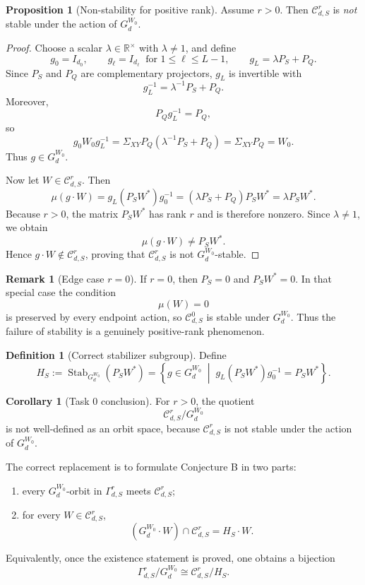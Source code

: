 \documentclass{article}
\newcommand{\Stab}{\operatorname{Stab}}
\theoremstyle{definition}
\newtheorem{proposition}[theorem]{Proposition}
\newtheorem{corollary}[theorem]{Corollary}
\newtheorem{definition}[theorem]{Definition}
\newtheorem{remark}[theorem]{Remark}
\begin{document}
\begin{proposition}[Non-stability for positive rank]\label{prop:nonstable-positive-rank}
Assume $r>0$. Then $\mathcal C_{d,S}^r$ is \emph{not} stable under the action of $G_d^{W_0}$.
\end{proposition}

\begin{proof}
Choose a scalar $\lambda\in \mathbb R^\times$ with $\lambda\neq 1$, and define
\[
g_0=I_{d_0},
\qquad
g_\ell=I_{d_\ell}\ \text{ for }1\le \ell\le L-1,
\qquad
g_L=\lambda P_S+P_Q.
\]
Since $P_S$ and $P_Q$ are complementary projectors, $g_L$ is invertible with
\[
g_L^{-1}=\lambda^{-1}P_S+P_Q.
\]
Moreover,
\[
P_Qg_L^{-1}=P_Q,
\]
so
\[
g_0W_0g_L^{-1}
=
\Sigma_{XY}P_Q(\lambda^{-1}P_S+P_Q)
=
\Sigma_{XY}P_Q
=
W_0.
\]
Thus $g\in G_d^{W_0}$.

Now let $W\in \mathcal C_{d,S}^r$. Then
\[
\mu(g\cdot W)=g_L(P_SW^\ast)g_0^{-1}
=
(\lambda P_S+P_Q)P_SW^\ast
=
\lambda P_SW^\ast.
\]
Because $r>0$, the matrix $P_SW^\ast$ has rank $r$ and is therefore nonzero. Since $\lambda\neq 1$, we obtain
\[
\mu(g\cdot W)\neq P_SW^\ast.
\]
Hence $g\cdot W\notin \mathcal C_{d,S}^r$, proving that $\mathcal C_{d,S}^r$ is not $G_d^{W_0}$-stable.
\end{proof}

\begin{remark}[Edge case $r=0$]
If $r=0$, then $P_S=0$ and $P_SW^\ast=0$. In that special case the condition
\[
\mu(W)=0
\]
is preserved by every endpoint action, so $\mathcal C_{d,S}^0$ is stable under $G_d^{W_0}$. Thus the failure of stability is a genuinely positive-rank phenomenon.
\end{remark}

\begin{definition}[Correct stabilizer subgroup]
Define
\[
H_S
:=
\Stab_{G_d^{W_0}}(P_SW^\ast)
=
\left\{
g\in G_d^{W_0}
\;\middle|\;
g_L(P_SW^\ast)g_0^{-1}=P_SW^\ast
\right\}.
\]
\end{definition}

\begin{corollary}[Task 0 conclusion]
For $r>0$, the quotient
\[
\mathcal C_{d,S}^r/G_d^{W_0}
\]
is not well-defined as an orbit space, because $\mathcal C_{d,S}^r$ is not stable under the action of $G_d^{W_0}$.

The correct replacement is to formulate Conjecture B in two parts:
\begin{enumerate}
\item every $G_d^{W_0}$-orbit in $\Gamma_{d,S}^r$ meets $\mathcal C_{d,S}^r$;
\item for every $W\in \mathcal C_{d,S}^r$,
\[
(G_d^{W_0}\cdot W)\cap \mathcal C_{d,S}^r
=
H_S\cdot W.
\]
\end{enumerate}
Equivalently, once the existence statement is proved, one obtains a bijection
\[
\Gamma_{d,S}^r/G_d^{W_0}
\cong
\mathcal C_{d,S}^r/H_S.
\]
\end{corollary}
\end{document}
